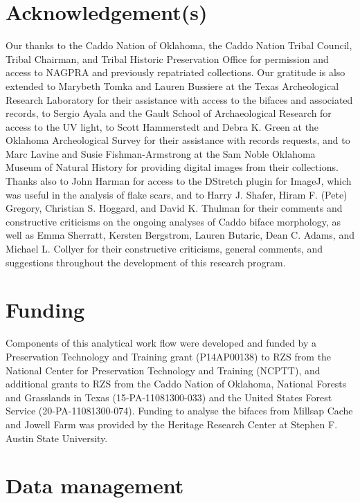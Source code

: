 \documentclass[]{interact}
\theoremstyle{plain}%
\theoremstyle{definition}
\theoremstyle{remark}
\begin{document}
\hypertarget{acknowledgements}{%
\section*{Acknowledgement(s)}\label{acknowledgements}}

Our thanks to the Caddo Nation of Oklahoma, the Caddo Nation Tribal
Council, Tribal Chairman, and Tribal Historic Preservation Office for
permission and access to NAGPRA and previously repatriated collections.
Our gratitude is also extended to Marybeth Tomka and Lauren Bussiere at
the Texas Archeological Research Laboratory for their assistance with
access to the bifaces and associated records, to Sergio Ayala and the
Gault School of Archaeological Research for access to the UV light, to
Scott Hammerstedt and Debra K. Green at the Oklahoma Archeological
Survey for their assistance with records requests, and to Marc Lavine
and Susie Fishman-Armstrong at the Sam Noble Oklahoma Museum of Natural
History for providing digital images from their collections. Thanks also
to John Harman for access to the DStretch plugin for ImageJ, which was
useful in the analysis of flake scars, and to Harry J. Shafer, Hiram F.
(Pete) Gregory, Christian S. Hoggard, and David K. Thulman for their
comments and constructive criticisms on the ongoing analyses of Caddo
biface morphology, as well as Emma Sherratt, Kersten Bergstrom, Lauren
Butaric, Dean C. Adams, and Michael L. Collyer for their constructive
criticisms, general comments, and suggestions throughout the development
of this research program.

\hypertarget{funding}{%
\section*{Funding}\label{funding}}

Components of this analytical work flow were developed and funded by a
Preservation Technology and Training grant (P14AP00138) to RZS from the
National Center for Preservation Technology and Training (NCPTT), and
additional grants to RZS from the Caddo Nation of Oklahoma, National
Forests and Grasslands in Texas (15-PA-11081300-033) and the United
States Forest Service (20-PA-11081300-074). Funding to analyse the
bifaces from Millsap Cache and Jowell Farm was provided by the Heritage
Research Center at Stephen F. Austin State University.

\hypertarget{data-management}{%
\section{Data management}\label{data-management}}
\end{document}

